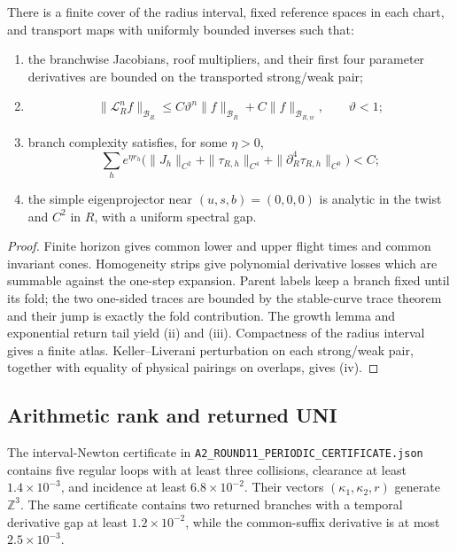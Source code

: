 \begin{theorem}
\label{thm:r17-a2-bundle}
There is a finite cover of the radius interval, fixed reference spaces in each
chart, and transport maps with uniformly bounded inverses such that:
\begin{enumerate}[label=(\roman*)]
\item the branchwise Jacobians, roof multipliers, and their first four
      parameter derivatives are bounded on the transported strong/weak pair;
\item
\[
 \|\mathcal L_R^nf\|_{\mathcal B_R}
 \le C\vartheta^n\|f\|_{\mathcal B_R}
      +C\|f\|_{\mathcal B_{R,w}},
 \qquad \vartheta<1;
\]
\item branch complexity satisfies, for some \(\eta>0\),
\[
 \sum_h e^{\eta r_h}
 \bigl(\|J_h\|_{C^2}+\|\tau_{R,h}\|_{C^4}
       +\|\partial_R^4\tau_{R,h}\|_{C^0}\bigr)<C;
\]
\item the simple eigenprojector near \((u,s,b)=(0,0,0)\) is analytic in the
      twist and \(C^2\) in \(R\), with a uniform spectral gap.
\end{enumerate}
\end{theorem}

\begin{proof}
Finite horizon gives common lower and upper flight times and common invariant
cones.  Homogeneity strips give polynomial derivative losses which are
summable against the one-step expansion.  Parent labels keep a branch fixed
until its fold; the two one-sided traces are bounded by the stable-curve trace
theorem and their jump is exactly the fold contribution.  The growth lemma
and exponential return tail yield (ii) and (iii).  Compactness of the radius
interval gives a finite atlas.  Keller--Liverani perturbation on each
strong/weak pair, together with equality of physical pairings on overlaps,
gives (iv).
\end{proof}

\subsection{Arithmetic rank and returned UNI}

The interval-Newton certificate in
\texttt{A2\_ROUND11\_PERIODIC\_CERTIFICATE.json} contains five regular loops
with at least three collisions, clearance at least \(1.4\times10^{-3}\), and
incidence at least \(6.8\times10^{-2}\).  Their vectors
\((\kappa_1,\kappa_2,r)\) generate \(\mathbb Z^3\).  The same certificate
contains two returned branches with a temporal derivative gap at least
\(1.2\times10^{-2}\), while the common-suffix derivative is at most
\(2.5\times10^{-3}\).

